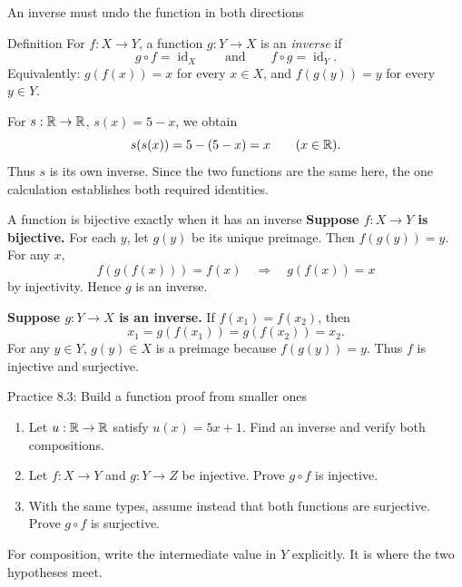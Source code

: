 \begin{frame}{An inverse must undo the function in both directions}
\begin{block}{Definition}
For $f:X\to Y$, a function $g:Y\to X$ is an \emph{inverse} if
\[
 g\circ f=\operatorname{id}_X
 \qquad\text{and}\qquad
 f\circ g=\operatorname{id}_Y.
\]
Equivalently: $g(f(x))=x$ for every $x\in X$, and $f(g(y))=y$ for every $y\in Y$.
\end{block}
For $s:\mathbb{R}\to\mathbb{R}$, $s(x)=5-x$, we obtain
\[
 s(s(x))=5-(5-x)=x\qquad(x\in\mathbb{R}).
\]
Thus $s$ is its own inverse. Since the two functions are the same here,
the one calculation establishes both required identities.
\end{frame}

\begin{frame}{A function is bijective exactly when it has an inverse}
\textbf{Suppose $f:X\to Y$ is bijective.}
For each $y$, let $g(y)$ be its unique preimage. Then $f(g(y))=y$.
For any $x$,
\[
 f(g(f(x)))=f(x)\quad\Longrightarrow\quad g(f(x))=x
\]
by injectivity. Hence $g$ is an inverse.
\medskip

\textbf{Suppose $g:Y\to X$ is an inverse.}
If $f(x_1)=f(x_2)$, then
\[
x_1=g(f(x_1))=g(f(x_2))=x_2.
\]
For any $y\in Y$, $g(y)\in X$ is a preimage because $f(g(y))=y$.
Thus $f$ is injective and surjective.
\end{frame}

\begin{frame}{Practice 8.3: Build a function proof from smaller ones}
\begin{enumerate}
\item Let $u:\mathbb{R}\to\mathbb{R}$ satisfy $u(x)=5x+1$. Find an inverse and verify both compositions.
\item Let $f:X\to Y$ and $g:Y\to Z$ be injective. Prove $g\circ f$ is injective.
\item With the same types, assume instead that both functions are surjective.
Prove $g\circ f$ is surjective.
\end{enumerate}
For composition, write the intermediate value in $Y$ explicitly.
It is where the two hypotheses meet.
\end{frame}

